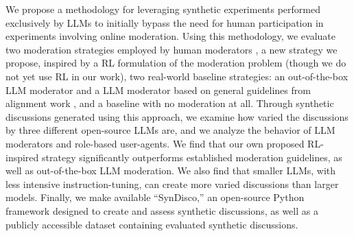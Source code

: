We propose a methodology for leveraging synthetic experiments performed exclusively by \acp{LLM} to initially bypass the need for human participation in experiments involving online moderation. Using this methodology, we evaluate two moderation strategies employed by human moderators \cite{dimitra-guide, Cornell_eRulemaking2017}, a new strategy we propose, inspired by a \acf{RL} formulation of the moderation problem (though we do not yet use \ac{RL} in our work), two real-world baseline strategies: an out-of-the-box \ac{LLM} moderator and a \ac{LLM} moderator based on general guidelines from alignment work \cite{collective_constitution}, and a baseline with no moderation at all. Through synthetic discussions generated using this approach, we examine how varied the discussions by three different open-source \acp{LLM} are, and we analyze the behavior of \ac{LLM} moderators and role-based user-agents. We find that our own proposed \ac{RL}-inspired strategy significantly outperforms established moderation guidelines, as well as out-of-the-box \ac{LLM} moderation. We also find that smaller \acp{LLM}, with less intensive instruction-tuning, can create more varied discussions than larger models. Finally, we make available “SynDisco,” an open-source Python framework designed to create and assess synthetic discussions, as well as a publicly accessible dataset \datasetlink containing evaluated synthetic discussions. 